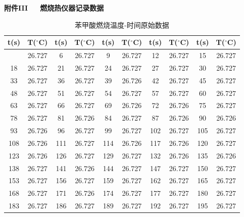 \documentclass[12pt]{ctexart}
\numberwithin{equation}{section}
\begin{document}
\begin{center}
    \Large\bfseries{附件III~~~燃烧热仪器记录数据}
\end{center}

\begin{longtable}{cc|cc|cc|cc|cc}
    \caption{苯甲酸燃烧温度-时间原始数据} \\
    \hline
    t(s) & T($^\circ$C) & t(s) & T($^\circ$C) & t(s) & T($^\circ$C) & t(s) & T($^\circ$C) & t(s) & T($^\circ$C) \\
    \hline
    \endhead
    \hline
    \endfoot
    3        & 26.727   & 6        & 26.727   & 9        & 26.727   & 12       & 26.727   & 15       & 26.727   \\
    18       & 26.727   & 21       & 26.727   & 24       & 26.727   & 27       & 26.727   & 30       & 26.727   \\
    33       & 26.727   & 36       & 26.727   & 39       & 26.726   & 42       & 26.727   & 45       & 26.727   \\
    48       & 26.727   & 51       & 26.727   & 54       & 26.727   & 57       & 26.727   & 60       & 26.727   \\
    63       & 26.727   & 66       & 26.727   & 69       & 26.726   & 72       & 26.726   & 75       & 26.727   \\
    78       & 26.727   & 81       & 26.726   & 84       & 26.727   & 87       & 26.726   & 90       & 26.726   \\
    93       & 26.726   & 96       & 26.727   & 99       & 26.727   & 102      & 26.727   & 105      & 26.727   \\
    108      & 26.726   & 111      & 26.727   & 114      & 26.726   & 117      & 26.726   & 120      & 26.727   \\
    123      & 26.726   & 126      & 26.727   & 129      & 26.727   & 132      & 26.726   & 135      & 26.726   \\
    138      & 26.727   & 141      & 26.726   & 144      & 26.727   & 147      & 26.727   & 150      & 26.727   \\
    153      & 26.727   & 156      & 26.727   & 159      & 26.727   & 162      & 26.727   & 165      & 26.727   \\
    168      & 26.727   & 171      & 26.726   & 174      & 26.727   & 177      & 26.727   & 180      & 26.727   \\
    183      & 26.727   & 186      & 26.727   & 189      & 26.727   & 192      & 26.727   & 195      & 26.727   \\

\end{longtable}
\end{document}
